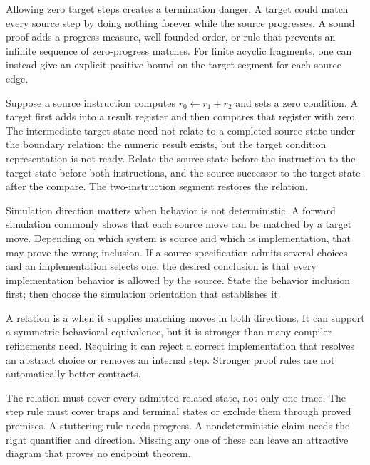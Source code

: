 Allowing zero target steps creates a termination danger. A target could match
every source step by doing nothing forever while the source progresses. A
sound proof adds a progress measure, well-founded order, or rule that prevents
an infinite sequence of zero-progress matches. For finite acyclic fragments,
one can instead give an explicit positive bound on the target segment for each
source edge.

\begin{example}[title={One source move, two target moves}]
Suppose a source instruction computes \(r_0\leftarrow r_1+r_2\) and sets a
zero condition. A target first adds into a result register and then compares
that register with zero. The intermediate target state need not relate to a
completed source state under the boundary relation: the numeric result exists,
but the target condition representation is not ready. Relate the source state
before the instruction to the target state before both instructions, and the
source successor to the target state after the compare. The two-instruction
segment restores the relation.
\end{example}

Simulation direction matters when behavior is not deterministic. A forward
simulation commonly shows that each source move can be matched by a target
move. Depending on which system is source and which is implementation, that
may prove the wrong inclusion. If a source specification admits several
choices and an implementation selects one, the desired conclusion is that
every implementation behavior is allowed by the source. State the behavior
inclusion first; then choose the simulation orientation that establishes it.

A relation is a  when it supplies matching moves in both
directions. It can
support a symmetric behavioral equivalence, but it is stronger than many
compiler refinements need. Requiring it can reject a correct implementation
that resolves an abstract choice or removes an internal step. Stronger proof
rules are not automatically better contracts.

\begin{warning}[title={A diagram of paired arrows is not yet a simulation proof}]
The relation must cover every admitted related state, not only one trace. The
step rule must cover traps and terminal states or exclude them through proved
premises. A stuttering rule needs progress. A nondeterministic claim needs the
right quantifier and direction. Missing any one of these can leave an
attractive diagram that proves no endpoint theorem.
\end{warning}

